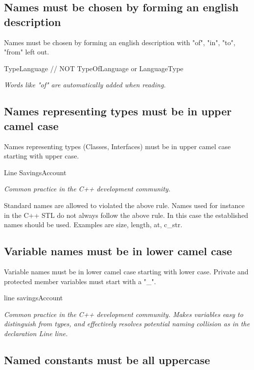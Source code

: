 \documentclass[a4paper,11pt,oneside]{scrbook}
\newcommand{\guideline}[1]{{\subsection{#1}}}
\newcommand{\motivation}[1]{{\normalfont \itshape #1}}
\newcommand{\trcode}[1]{{\normalfont \ttfamily #1}}
\begin{document}
\guideline{Names must be chosen by forming an english description}

Names must be chosen by forming an english description with "of", "in", "to",
"from" left out.

\begin{code}
  TypeLanguage  // NOT TypeOfLanguage or LanguageType
\end{code}

\motivation{
  Words like "of" are automatically added when reading.
}

\guideline{Names representing types must be in upper camel case}

Names representing types (Classes, Interfaces) must be in upper camel case
starting with upper case.

\begin{code}
  Line
  SavingsAccount
\end{code}

\motivation{
  Common practice in the C++ development community. 
}

Standard names are allowed to violated the above rule. Names used for instance
in the C++ STL do not always follow the above rule. In this case the established
names should be used. Examples are \trcode{size}, \trcode{length}, \trcode{at},
\trcode{c\_str}.

\guideline{Variable names must be in lower camel case}

Variable names must be in lower camel case starting with lower case.  Private
and protected member variables must start with a "\_".

\begin{code}
  line
  savingsAccount
\end{code}

\motivation{ 
  Common practice in the C++ development community. Makes variables easy to
  distinguish from types, and effectively resolves potential naming collision as
  in the declaration Line line.
}

\guideline{Named constants must be all uppercase}
\end{document}

